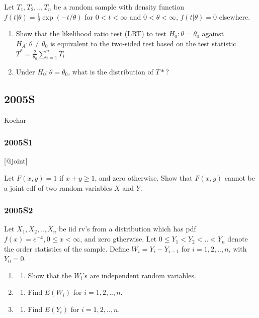 \documentclass[10pt,twocolumn,portrait]{article}
\providecommand{\tightlist}{%
  \setlength{\itemsep}{0pt}\setlength{\parskip}{0pt}}
\begin{document}
Let \(T_1,T_2,..,T_n\) be a random sample with density function
\(f(t|\theta)=\frac1\theta\exp(-t/\theta)\) for \(0<t<\infty\) and
\(0<\theta<\infty\), \(f(t|\theta)=0\) elsewhere.

\begin{enumerate}
\def\labelenumi{(\alph{enumi})}
\item
  Show that the likelihood ratio test (LRT) to test
  \(H_0:\theta=\theta_0\) against \(H_A:\theta\neq\theta_0\) is
  equivalent to the two-sided test based on the test statistic
  \(T^*=\frac{2}{\theta_0}\sum^n_{i=1}T_i\)
\item
  Under \(H_0:\theta=\theta_0\), what is the distribution of \(T*\)?
\end{enumerate}

\hypertarget{s-1}{%
\subsection{2005S}\label{s-1}}

Kochar

\hypertarget{s1-1}{%
\subsubsection{2005S1}\label{s1-1}}

{[}@joint{]}

Let \(F(x,y)=1\) if \(x+y\ge1\), and zero otherwise. Show that
\(F(x,y)\) cannot be a joint cdf of two random variables \(X\) and
\(Y\).

\hypertarget{s2-1}{%
\subsubsection{2005S2}\label{s2-1}}

Let \(X_1,X_2,..,X_n\) be iid rv's from a distribution which has pdf
\(f(x)=e^{-x},0\le x<\infty\), and zero gtherwise. Let
\(0\le Y_1<Y_2<..<Y_n\) denote the order statistics of the sample.
Define \(W_i= Y_i-Y_{i-1}\) for \(i = 1,2,..,n\), with \(Y_0=0\).

\begin{enumerate}
\def\labelenumi{(\alph{enumi})}
\item
  \begin{enumerate}
  \def\labelenumii{(\arabic{enumii})}
  \setcounter{enumii}{5}
  \tightlist
  \item
    Show that the \(W_i\)'s are independent random variables.
  \end{enumerate}
\item
  \begin{enumerate}
  \def\labelenumii{(\arabic{enumii})}
  \setcounter{enumii}{2}
  \tightlist
  \item
    Find \(E(W_i)\) for \(i = 1,2,..,n\).
  \end{enumerate}
\item
  \begin{enumerate}
  \def\labelenumii{(\arabic{enumii})}
  \setcounter{enumii}{2}
  \tightlist
  \item
    Find \(E(Y_i)\) for \(i = 1,2,..,n\).
  \end{enumerate}
\end{enumerate}
\end{document}
